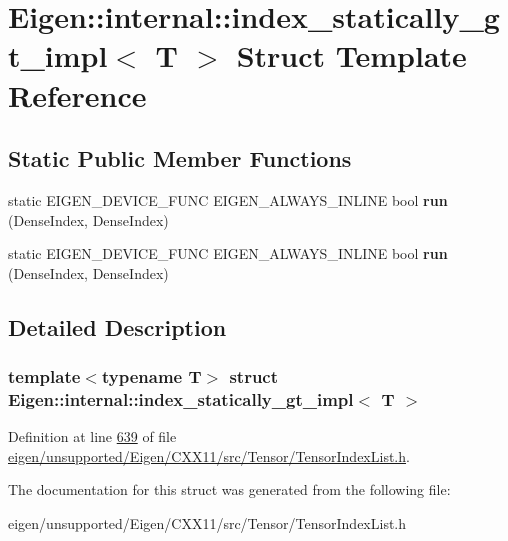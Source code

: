 \hypertarget{struct_eigen_1_1internal_1_1index__statically__gt__impl}{}\section{Eigen\+:\+:internal\+:\+:index\+\_\+statically\+\_\+gt\+\_\+impl$<$ T $>$ Struct Template Reference}
\label{struct_eigen_1_1internal_1_1index__statically__gt__impl}
\subsection*{Static Public Member Functions}
\begin{DoxyCompactItemize}
\item 
\mbox{\label{struct_eigen_1_1internal_1_1index__statically__gt__impl_abc038fa5efabaf58b621b1380c82a1e3}} 
static E\+I\+G\+E\+N\+\_\+\+D\+E\+V\+I\+C\+E\+\_\+\+F\+U\+NC E\+I\+G\+E\+N\+\_\+\+A\+L\+W\+A\+Y\+S\+\_\+\+I\+N\+L\+I\+NE bool {\bfseries run} (Dense\+Index, Dense\+Index)
\item 
\mbox{\label{struct_eigen_1_1internal_1_1index__statically__gt__impl_abc038fa5efabaf58b621b1380c82a1e3}} 
static E\+I\+G\+E\+N\+\_\+\+D\+E\+V\+I\+C\+E\+\_\+\+F\+U\+NC E\+I\+G\+E\+N\+\_\+\+A\+L\+W\+A\+Y\+S\+\_\+\+I\+N\+L\+I\+NE bool {\bfseries run} (Dense\+Index, Dense\+Index)
\end{DoxyCompactItemize}


\subsection{Detailed Description}
\subsubsection*{template$<$typename T$>$\newline
struct Eigen\+::internal\+::index\+\_\+statically\+\_\+gt\+\_\+impl$<$ T $>$}



Definition at line \hyperlink{eigen_2unsupported_2_eigen_2_c_x_x11_2src_2_tensor_2_tensor_index_list_8h_source_l00639}{639} of file \hyperlink{eigen_2unsupported_2_eigen_2_c_x_x11_2src_2_tensor_2_tensor_index_list_8h_source}{eigen/unsupported/\+Eigen/\+C\+X\+X11/src/\+Tensor/\+Tensor\+Index\+List.\+h}.



The documentation for this struct was generated from the following file\+:\begin{DoxyCompactItemize}
\item 
eigen/unsupported/\+Eigen/\+C\+X\+X11/src/\+Tensor/\+Tensor\+Index\+List.\+h\end{DoxyCompactItemize}
